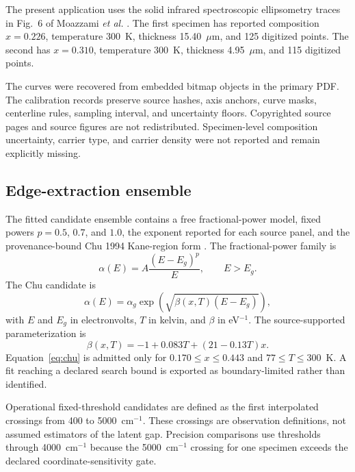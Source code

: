The present application uses the solid infrared spectroscopic ellipsometry traces in Fig.~6 of Moazzami \emph{et al.} \cite{Moazzami2005}. The first specimen has reported composition $x=0.226$, temperature 300~K, thickness 15.40~$\mu$m, and 125 digitized points. The second has $x=0.310$, temperature 300~K, thickness 4.95~$\mu$m, and 115 digitized points.

The curves were recovered from embedded bitmap objects in the primary PDF. The calibration records preserve source hashes, axis anchors, curve masks, centerline rules, sampling interval, and uncertainty floors. Copyrighted source pages and source figures are not redistributed. Specimen-level composition uncertainty, carrier type, and carrier density were not reported and remain explicitly missing.

\subsection{Edge-extraction ensemble}
\label{sec:edge-ensemble}

The fitted candidate ensemble contains a free fractional-power model, fixed powers $p=0.5$, $0.7$, and $1.0$, the exponent reported for each source panel, and the provenance-bound Chu 1994 Kane-region form \cite{Chu1994}. The fractional-power family is
\begin{equation}
  \alpha(E) = A\frac{(E-E_g)^p}{E}, \qquad E>E_g.
  \label{eq:fractional-power}
\end{equation}
The Chu candidate is
\begin{equation}
  \alpha(E) = \alpha_g \exp\!\left(\sqrt{\beta(x,T)(E-E_g)}\right),
  \label{eq:chu}
\end{equation}
with $E$ and $E_g$ in electronvolts, $T$ in kelvin, and $\beta$ in eV$^{-1}$. The source-supported parameterization is
\begin{equation}
  \beta(x,T) = -1 + 0.083T + (21-0.13T)x.
  \label{eq:chu-beta}
\end{equation}
Equation~\eqref{eq:chu} is admitted only for $0.170\leq x\leq0.443$ and $77\leq T\leq300$~K. A fit reaching a declared search bound is exported as boundary-limited rather than identified.

Operational fixed-threshold candidates are defined as the first interpolated crossings from 400 to 5000~cm$^{-1}$. These crossings are observation definitions, not assumed estimators of the latent gap. Precision comparisons use thresholds through 4000~cm$^{-1}$ because the 5000~cm$^{-1}$ crossing for one specimen exceeds the declared coordinate-sensitivity gate.

